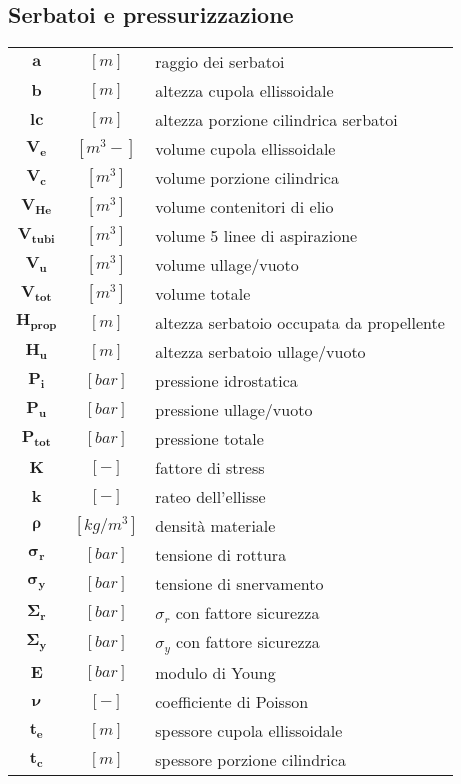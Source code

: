 \begin{multicols}{2}
	\subsection{Serbatoi e pressurizzazione}
	\begin{tabular}{ccl}
		$\bm{a}$ & $[m]$ & raggio dei serbatoi \\
		$\bm{b}$ & $[m]$ & altezza cupola ellissoidale \\
		$\bm{lc}$ & $[m]$ & altezza porzione cilindrica serbatoi \\
		$\bm{V_{e}}$ & $[m^3-]$ & volume cupola ellissoidale \\
	    $\bm{V_{c}}$ & $[m^3]$ & volume porzione cilindrica \\
	    $\bm{V_{He}}$ & $[m^3]$ & volume contenitori di elio \\	
     	$\bm{V_{tubi}}$ & $[m^3]$ & volume 5 linee di aspirazione \\		
        $\bm{V_{u}}$ & $[m^3]$ & volume ullage/vuoto \\
	    $\bm{V_{tot}}$ & $[m^3]$ & volume totale \\
	    $\bm{H_{prop}}$ & $[m]$ & altezza serbatoio occupata da propellente\\
		$\bm{H_{u}}$ & $[m]$ & altezza serbatoio ullage/vuoto \\
	    $\bm{P_{i}}$ & $[bar]$ & pressione idrostatica  \\
	    $\bm{P_{u}}$ & $[bar]$ & pressione ullage/vuoto \\
		$\bm{P_{tot}}$ & $[bar]$ & pressione totale \\
	    $\bm{K }$ & $[-]$ & fattore di stress \\
	    $\bm{k}$ & $[-]$ & rateo dell'ellisse \\
	    $\bm{\rho}$ & $[kg/m^3]$ & densità materiale \\
	    $\bm{\sigma_{r}}$ & $[bar]$ & tensione di rottura \\
		$\bm{\sigma_{y}}$ & $[bar]$ & tensione di snervamento \\
	    $\bm{\Sigma_{r}}$ & $[bar]$ & $\sigma_{r}$ con fattore sicurezza\\
	    $\bm{\Sigma_{y}}$ & $[bar]$ & $\sigma_{y}$ con fattore sicurezza \\
        $\bm{E}$ & $[bar]$ & modulo di Young \\
		$\bm{\nu}$ & $[-]$ & coefficiente di Poisson \\
		$\bm{t_{e}}$ & $[m]$ & spessore cupola ellissoidale \\
		$\bm{t_{c}}$ & $[m]$ & spessore porzione cilindrica 
	\end{tabular}


\end{multicols}
